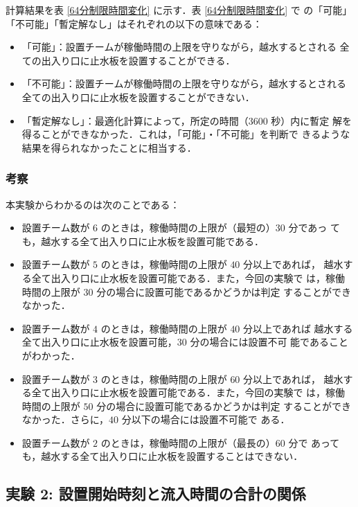 \documentclass[a4paper,12pt,fleqn]{jarticle}
\begin{document}
計算結果を表 \ref{64分制限時間変化} に示す．表 \ref{64分制限時間変化} で
の「可能」「不可能」「暫定解なし」はそれぞれの以下の意味である：
%
\begin{itemize}
 \item 「可能」：設置チームが稼働時間の上限を守りながら，越水するとされる
       全ての出入り口に止水板を設置することができる．
 \item 「不可能」：設置チームが稼働時間の上限を守りながら，越水するとされる
       全ての出入り口に止水板を設置することができない．
 \item 「暫定解なし」：最適化計算によって，所定の時間（3600 秒）内に暫定
       解を得ることができなかった．これは，「可能」・「不可能」を判断で
       きるような結果を得られなかったことに相当する．
\end{itemize}

\subsubsection{考察}

本実験からわかるのは次のことである：
%
\begin{itemize}
 \item 設置チーム数が $6$ のときは，稼働時間の上限が（最短の）$30$ 分であっ
       ても，越水する全て出入り口に止水板を設置可能である．
 \item 設置チーム数が $5$ のときは，稼働時間の上限が $40$ 分以上であれば，
       越水する全て出入り口に止水板を設置可能である．また，今回の実験で
       は，稼働時間の上限が $30$ 分の場合に設置可能であるかどうかは判定
       することができなかった．
 \item 設置チーム数が $4$ のときは，稼働時間の上限が $40$ 分以上であれば
       越水する全て出入り口に止水板を設置可能，$30$ 分の場合には設置不可
       能であることがわかった．
 \item 設置チーム数が $3$ のときは，稼働時間の上限が $60$ 分以上であれば，
       越水する全て出入り口に止水板を設置可能である．また，今回の実験で
       は，稼働時間の上限が $50$ 分の場合に設置可能であるかどうかは判定
       することができなかった．さらに，$40$ 分以下の場合には設置不可能で
       ある．
 \item 設置チーム数が $2$ のときは，稼働時間の上限が（最長の）$60$ 分で
       あっても，越水する全て出入り口に止水板を設置することはできない．
\end{itemize}

\subsection{実験 2: 設置開始時刻と流入時間の合計の関係}
\end{document}
